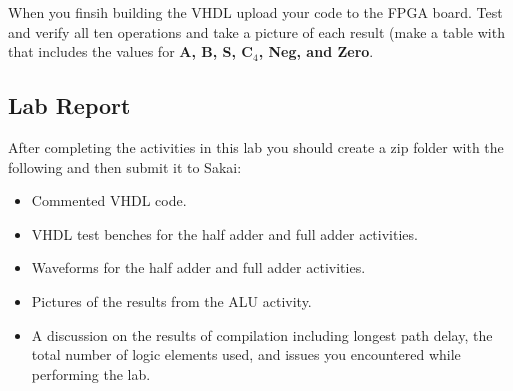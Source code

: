 When you finsih building the VHDL upload your code to the FPGA board. Test and verify all ten operations and take a picture of each result (make a table with that includes the values for {\bf A, B, S, C$_4$, Neg, and Zero}.
\subsection{Lab Report}
After completing the activities in this lab you should create a zip folder with the following and then submit it to Sakai:

\begin{itemize}
	\item Commented VHDL code.
	\item VHDL test benches for the half adder and full adder activities.
	\item Waveforms for the half adder and full adder activities.
	\item Pictures of the results from the ALU activity.
	\item A discussion on the results of compilation including longest path delay, the total number of logic elements used, and issues you encountered while performing the lab.
\end{itemize}

